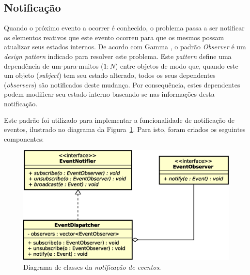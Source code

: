\subsection{Notificação}

Quando o próximo evento a ocorrer é conhecido, o problema passa a ser notificar
os elementos reativos que este evento ocorreu para que os mesmos possam
atualizar seus estados internos. De acordo com Gamma
\cite{Gamma:1995:DPE:186897}, o padrão \textit{Observer} é um \textit{design
pattern} indicado para resolver este problema. Este \textit{pattern} define uma
dependência de um-para-muitos ($1:N$) entre objetos de modo que, quando este um
objeto (\textit{subject}) tem seu estado alterado, todos os seus dependentes
(\textit{observers}) são notificados deste mudança. Por consequência, estes
dependentes podem modificar seu estado interno baseando-se nas informações desta
notificação.

Este padrão foi utilizado para implementar a funcionalidade de notificação de
eventos, ilustrado no diagrama da Figura~\ref{fig:diagram:notification}. Para
isto, foram criados os seguintes componentes:

\begin{figure}[htb!]
  \centering
  \includegraphics[scale=0.6]{img/EventNotifier}
  \caption{Diagrama de classes da \textit{notificação de eventos}.}
\label{fig:diagram:notification}
\end{figure}

